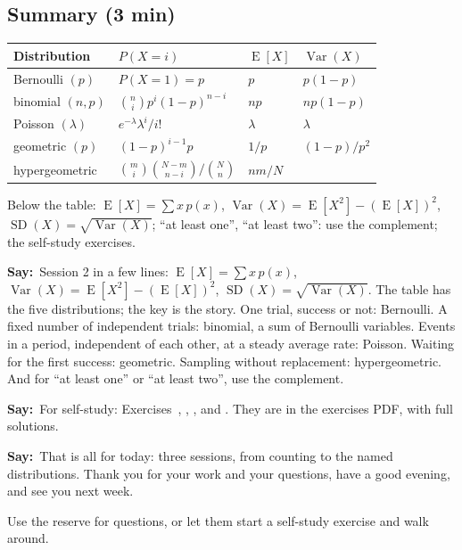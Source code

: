 \documentclass[11pt,a4paper,parskip=half]{scrartcl}
\newcommand{\E}{\operatorname{E}}
\newcommand{\Var}{\operatorname{Var}}
\newcommand{\SD}{\operatorname{SD}}
\newcommand{\say}{\textbf{\color{teal}Say:}\ }
\begin{document}
\begin{printskip}
	\subsection{Summary (3 min)}

	\needspace{0.22\textheight}
	\begin{onslide}
		\begin{center}
			\begin{tabular}{@{}llll@{}}
				\toprule
				Distribution        & $P(X=i)$                                          & $\E[X]$   & $\Var(X)$    \\\midrule
				Bernoulli $(p)$     & $P(X=1)=p$                                        & $p$       & $p(1-p)$     \\[3pt]
				binomial $(n,p)$    & $\binom{n}{i}p^i(1-p)^{n-i}$                      & $np$      & $np(1-p)$    \\[3pt]
				Poisson $(\lambda)$ & $e^{-\lambda}\lambda^i/i!$                        & $\lambda$ & $\lambda$    \\[3pt]
				geometric $(p)$     & $(1-p)^{i-1}p$                                    & $1/p$     & $(1-p)/p^2$  \\[3pt]
				hypergeometric      & $\binom{m}{i}\binom{N-m}{n-i}\big/\binom{N}{n}$   & $nm/N$    &              \\\bottomrule
			\end{tabular}
		\end{center}
		Below the table: $\E[X]=\sum x\,p(x)$, $\Var(X)=\E[X^2]-(\E[X])^2$,
		$\SD(X)=\sqrt{\Var(X)}$; ``at least one'', ``at least two'': use the
		complement; the self-study exercises.
	\end{onslide}

	\say Session 2 in a few lines: $\E[X]=\sum x\,p(x)$,
	$\Var(X)=\E[X^2]-(\E[X])^2$, $\SD(X)=\sqrt{\Var(X)}$. The table has the
	five distributions; the key is the story. One trial, success or not:
	Bernoulli. A fixed number of independent trials: binomial, a sum of
	Bernoulli variables. Events in a period, independent of each other, at
	a steady average rate: Poisson. Waiting for the
	first success: geometric. Sampling without replacement: hypergeometric.
	And for ``at least one'' or ``at least two'', use the complement.

	\say For self-study: Exercises~, ,
	,  and
	. They are in the exercises
	PDF, with full solutions.

	\say That is all for today: three sessions, from counting to the named
	distributions. Thank you for your work and your questions, have a good
	evening, and see you next week.

	\begin{cue}
		Use the reserve for questions, or let them start a self-study exercise
		and walk around.
	\end{cue}
\end{printskip}
\end{document}
